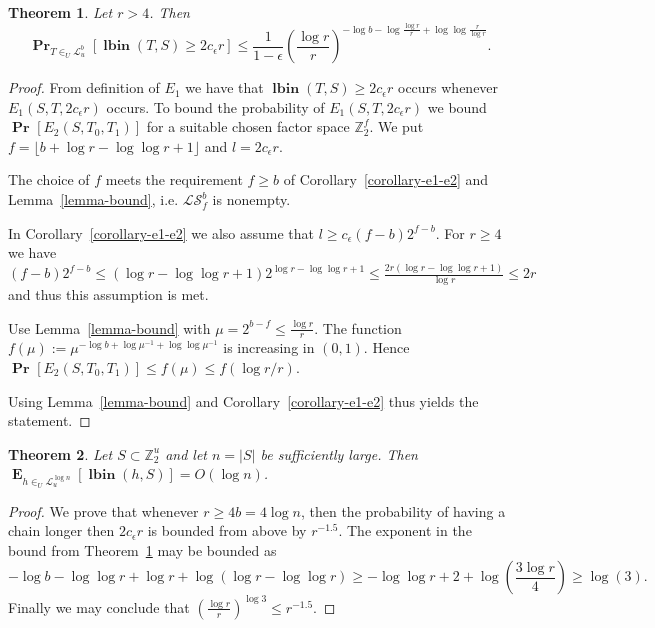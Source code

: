 \documentclass{article}
\newcommand{\lbin}[2]{\operatorname{\mathbf{lbin}}({#1}, {#2})}
\newcommand{\vecspace}[2]{\mathbb{Z}_{#1}^{#2}}
\newcommand{\binvecspace}[1]{\vecspace{2}{#1}}
\newcommand{\linearmaps}[2]{\mathcal{L}_{#1}^{#2}}
\newcommand{\surjectivelinearmaps}[2]{\mathcal{LS}_{#1}^{#2}}
\newcommand{\probs}[2]{\operatorname{\mathbf{Pr}}_{{#1}}\left[{#2}\right]}
\newcommand{\prob}[1]{\probs{}{#1}}
\newcommand{\expects}[2]{\operatorname{\mathbf{E}}_{{#1}}\left[{#2}\right]}
\newtheorem{theorem}{Theorem}
\begin{document}
\begin{theorem}
\label{theorem-prob-distribution-bound}
Let $r > 4$. Then
\[
\probs{T \in_U \linearmaps{u}{b}}{\lbin{T}{S} \geq 2 c_\epsilon r} \leq \frac{1}{1 - \epsilon}\left(\frac{\log r}{r}\right)^{-\log b - \log \frac{\log r}{r} + \log \log \frac{r}{\log r}}.
\]
\end{theorem}
\begin{proof}
From definition of $E_1$ we have that $\lbin{T}{S} \geq 2 c_\epsilon r$ occurs whenever $E_1(S, T, 2 c_\epsilon r)$ occurs.
To bound the probability of $E_1(S, T, 2 c_\epsilon r)$ we bound $\prob{E_2(S, T_0, T_1)}$ for a suitable chosen factor space $\binvecspace{f}$.
We put $f = \lfloor b + \log r - \log \log r + 1 \rfloor$ and $l = 2c_\epsilon r$.

The choice of $f$ meets the requirement $f \geq b$ of Corollary~\ref{corollary-e1-e2} and Lemma~\ref{lemma-bound}, i.e. $\surjectivelinearmaps{f}{b}$ is nonempty.

In Corollary~\ref{corollary-e1-e2} we also assume that $l \geq c_\epsilon (f - b)2^{f - b}$.
For $r \geq 4$ we have $(f - b)2^{f - b} \leq (\log r - \log \log r + 1)2^{\log r - \log \log r + 1} \leq \frac{2r(\log r - \log \log r + 1)}{\log r} \leq 2r$ and thus this assumption is met.

Use Lemma~\ref{lemma-bound} with $\mu = 2^{b - f} \leq \frac{\log r}{r}$.
The function $f(\mu) := \mu ^ {- \log b + \log \mu^{-1} + \log \log \mu^{-1}}$ is increasing in $(0, 1)$.
Hence $\prob{E_2(S, T_0, T_1)} \leq f(\mu) \leq f(\log r/r)$.

Using Lemma~\ref{lemma-bound} and Corollary~\ref{corollary-e1-e2} thus yields the statement.
\end{proof}

\begin{theorem}
Let $S \subset \binvecspace{u}$ and let $n = |S|$ be sufficiently large. Then $\expects{h \in_U \linearmaps{u}{\log n}}{\lbin{h}{S}} = O(\log n)$.
\end{theorem}
\begin{proof}
We prove that whenever $r \geq 4b = 4\log n$, then the probability of having a chain longer then $2 c_\epsilon r$ is bounded from above by $r^{-1.5}$.
The exponent in the bound from Theorem~\ref{theorem-prob-distribution-bound} may be bounded as
\[
-\log b - \log \log r + \log r + \log (\log r - \log \log r) \geq -\log \log r + 2 + \log \left(\frac{3\log r}{4}\right) \geq \log(3).
\]
Finally we may conclude that $\left(\frac{\log r}{r}\right)^{\log 3} \leq r^{-1.5}$.
\end{proof}
\end{document}
